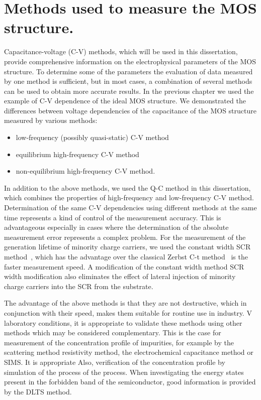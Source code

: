 
\chapter{Methods used to measure the MOS structure.}\label{Chapter3}

Capacitance-voltage (C-V) methods, which will be used in this
dissertation, provide comprehensive information on the electrophysical
parameters of the MOS structure. To determine some of the parameters
the evaluation of data measured by one method is sufficient, but in
most cases, a combination of several methods can be used to obtain
more accurate results. In the previous chapter we used the example of
C-V dependence of the ideal MOS structure. We demonstrated the
differences between voltage dependencies of the capacitance of the MOS
structure measured by various methods:

\begin{itemize}
\item low-frequency (possibly quasi-static) C-V method
\item equilibrium high-frequency C-V method
\item non-equilibrium high-frequency C-V method.
\end{itemize}

In addition to the above methods, we used the Q-C method in this
dissertation, which combines the properties of high-frequency and
low-frequency C-V method. Determination of the same C-V dependencies
using different methods at the same time represents a kind of control
of the measurement accuracy.  This is advantageous especially in cases
where the determination of the absolute measurement error represents a
complex problem. For the measurement of the generation lifetime of
minority charge carriers, we used the constant width SCR
method~\cite{3.1}, which has the advantage over the classical Zerbst
C-t method~\cite{3.2} is the faster measurement speed. A modification
of the constant width method SCR~\cite{3.3} width modification also
eliminates the effect of lateral injection of minority charge carriers
into the SCR from the substrate.

The advantage of the above methods is that they are not destructive,
which in conjunction with their speed, makes them suitable for routine
use in industry.  V laboratory conditions, it is appropriate to
validate these methods using other methods which may be considered
complementary. This is the case for measurement of the concentration
profile of impurities, for example by the scattering method
resistivity method, the electrochemical capacitance method or
SIMS\@. It is appropriate Also, verification of the concentration
profile by simulation of the process of the process. When
investigating the energy states present in the forbidden band of the
semiconductor, good information is provided by the DLTS method.

